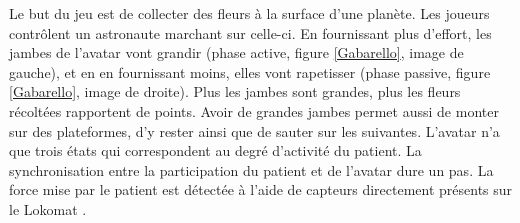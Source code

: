 		\begin{minipage}{\linewidth}
			\label{Lokomat}
		\end{minipage}\medskip%
		
		Le but du jeu est de collecter des fleurs à la surface d'une planète. Les joueurs contrôlent un astronaute marchant sur celle-ci. En fournissant plus d'effort, les jambes de l'avatar vont grandir (phase active, figure \ref{Gabarello}, image de gauche), et en en fournissant moins, elles vont rapetisser (phase passive, figure \ref{Gabarello}, image de droite). Plus les jambes sont grandes, plus les fleurs récoltées rapportent de points. Avoir de grandes jambes permet aussi de monter sur des plateformes, d'y rester ainsi que de sauter sur les suivantes. L'avatar n'a que trois états qui correspondent au degré d'activité du patient. La synchronisation entre la participation du patient et de l'avatar dure un pas. La force mise par le patient est détectée à l'aide de capteurs directement présents sur le Lokomat \cite{Labruyere_LokomatGabarello}.\medskip
		
		\begin{minipage}{\linewidth}
			\label{Gabarello}
		\end{minipage}\medskip
		
